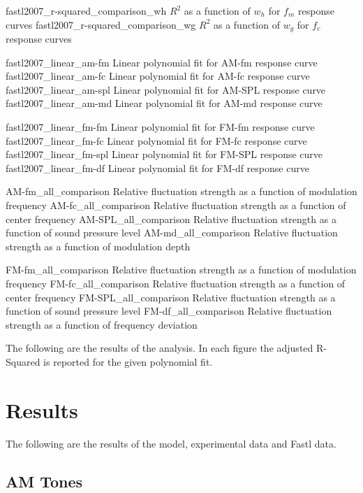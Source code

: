 \documentclass{article}
\begin{document}
\figurepair%
  {fastl2007_r-squared_comparison_wh}
  {$R^2$ as a function of $w_h$ for $f_m$ response curves}
  {fastl2007_r-squared_comparison_wg}
  {$R^2$ as a function of $w_g$ for $f_c$ response curves}

\figurequad%
  {fastl2007_linear_am-fm}
  {Linear polynomial fit for AM-fm response curve}
  {fastl2007_linear_am-fc}
  {Linear polynomial fit for AM-fc response curve}
  {fastl2007_linear_am-spl}
  {Linear polynomial fit for AM-SPL response curve}
  {fastl2007_linear_am-md}
  {Linear polynomial fit for AM-md response curve}

\figurequad%
  {fastl2007_linear_fm-fm}
  {Linear polynomial fit for FM-fm response curve}
  {fastl2007_linear_fm-fc}
  {Linear polynomial fit for FM-fc response curve}
  {fastl2007_linear_fm-spl}
  {Linear polynomial fit for FM-SPL response curve}
  {fastl2007_linear_fm-df}
  {Linear polynomial fit for FM-df response curve}

\begin{comparison}
\figurequad%
  {AM-fm_all_comparison}
  {Relative fluctuation strength as a function of modulation frequency}
  {AM-fc_all_comparison}
  {Relative fluctuation strength as a function of center frequency}
  {AM-SPL_all_comparison}
  {Relative fluctuation strength as a function of sound pressure level}
  {AM-md_all_comparison}
  {Relative fluctuation strength as a function of modulation depth}

\figurequad%
  {FM-fm_all_comparison}
  {Relative fluctuation strength as a function of modulation frequency}
  {FM-fc_all_comparison}
  {Relative fluctuation strength as a function of center frequency}
  {FM-SPL_all_comparison}
  {Relative fluctuation strength as a function of sound pressure level}
  {FM-df_all_comparison}
  {Relative fluctuation strength as a function of frequency deviation}
\end{comparison}

The following are the results of the analysis. In each figure the adjusted
R-Squared is reported for the given polynomial fit.

\section{Results}
\label{sec:results}

The following are the results of the model, experimental data and Fastl data.

\subsection{AM Tones}
\label{subsec:results_am_tones}
\end{document}
